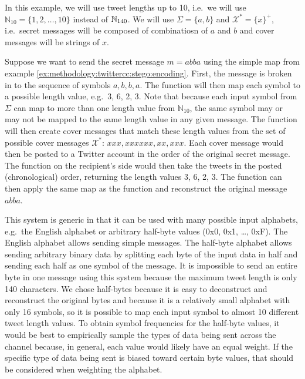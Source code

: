 \begin{example}
In this example, we will use tweet lengths up to 10, i.e.\ we will use
$\mathbb{N}_{10} = \{1, 2, \ldots, 10\}$ instead of $\mathbb{N}_{140}$.  We will use $\Sigma
= \{a, b\}$ and $\mathcal{X}^* = \{x\}^+$, i.e.\ secret messages will be composed
of combinatiosn of $a$ and $b$ and cover messages will be strings of $x$.

Suppose we want to send the secret message $m = abba$ using the simple
 map from example \ref{ex:methodology:twittercc:stego:encoding}.
First, the message
is broken in to the sequence of symbols $a, b, b, a$.  The  function
will then map each symbol to a possible length value, e.g.\ 3, 6, 2, 3.  Note
that because each input symbol from $\Sigma$ can map to more than one length
value from $\mathbb{N}_{10}$, the same symbol may or may not be mapped to the
same length value in any given message.  The  function will then
create cover messages that match these length values from the set of possible
cover messages $\mathcal{X}^*$: $xxx, xxxxxx, xx, xxx$.  Each cover message
would then be posted to a Twitter account in the order of the original secret
message.  The  function on the recipient's side would then take the
tweets in the posted (chronological) order, returning the length values 3, 6, 2,
3.  The  function can then apply the same map as the 
function and reconstruct the original message $abba$.
\end{example}

This system is generic in that it can be used with many possible input
alphabets, e.g.\ the  English alphabet or
arbitrary half-byte values (0x0, 0x1, \ldots, 0xF).  The English alphabet
allows sending simple messages.  The half-byte alphabet allows sending arbitrary
binary data by splitting each byte of the input data in half and sending each
half as one symbol of the message.  It is impossible to send an entire byte in
one message using this system because the maximum tweet length is only 140
characters.  We chose half-bytes because it is easy to deconstruct and
reconstruct the original bytes and because it is a relatively small alphabet
with only 16 symbols, so it is possible to map each input symbol to almost 10
different tweet length values.  To obtain symbol frequencies for the half-byte
values, it would be best to empirically sample the types of data being sent
across the channel because, in general, each value would likely have an equal
weight.  If the specific type of data being sent is biased toward certain byte
values, that should be considered when weighting the alphabet.

